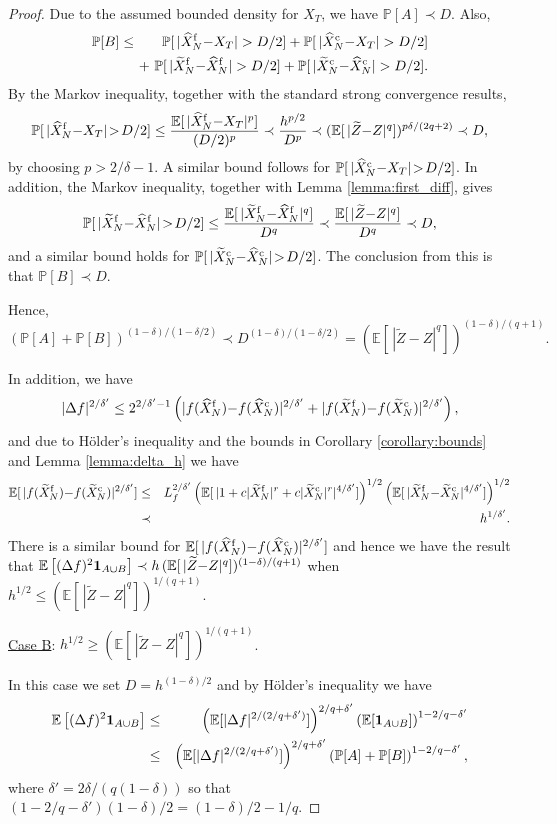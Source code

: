 \documentclass[11pt]{article}
\def \EE {{\mathbb{E}}}
\def \PP {{\mathbb{P}}}
\def \one {{\bf 1}}
\def \tZ {{\widetilde{Z}}}
\def \tXf  {{\widetilde{X}^{\rm f}}}
\def \tXc  {{\widetilde{X}^{\rm c}}}
\def \hXf {{\widehat{X}^{\rm f}}}
\def \hXc {{\widehat{X}^{\rm c}}}
\begin{document}
\begin{proof}
Due to the assumed bounded density for $X_T$, we have
$\PP[A] \prec D$.  Also, 
\begin{eqnarray*}
\PP[B] &\leq&  ~
\PP[\, |\hXf_N {-} X_T| > D/2] +
\PP[\, |\hXc_N {-} X_T| > D/2]
\\ & & \!\!\!\! +\
\PP[\, |\tXf_N {-} \hXf_N| > D/2] +
\PP[\, |\tXc_N {-} \hXc_N| > D/2].
\end{eqnarray*}
By the Markov inequality, together with the standard strong convergence
results,
\[
\PP[\, |\hXf_N {-} X_T| \!>\! D/2] 
\leq \frac{\EE[\, |\hXf_N {-} X_T|^p]}{(D/2)^p}
\prec \frac{h^{p/2}}{D^p}
\prec (\EE[\, |\tZ{-}Z|^q])^{p\delta/(2q+2)}
\prec D,
\]
by choosing $p>2/\delta - 1$.  A similar bound follows for
$\PP[\, |\hXc_N {-} X_T| \!>\! D/2]$.
In addition, the Markov inequality, together with Lemma \ref{lemma:first_diff}, gives
\[
\PP[\, |\tXf_N {-} \hXf_N| \!>\! D/2] 
\leq \frac{\EE[\, |\tXf_N {-} \hXf_N|^q]}{D^q}
\prec \frac{\EE[\, |\tZ{-}Z|^q]}{D^q} 
\prec D,
\]
and a similar bound holds for $\PP[\, |\tXc_N {-} \hXc_N| \!>\! D/2]$.
The conclusion from this is that $\PP[B]\prec D$.

Hence,
\[
\left( \PP[A] + \PP[B] \right)^{(1-\delta)/(1-\delta/2)} \prec D^{(1-\delta)/(1-\delta/2)}
 =  (\EE[\, |\tZ{-}Z|^q])^{(1-\delta)/(q+1)}.
\]

In addition, we have
\[
|\Delta f|^{2/\delta'} \leq 2^{2/\delta'-1}\left(
  |f(\hXf_N) {-} f(\hXc_N)|^{2/\delta'} + |f(\tXf_N) {-} f(\tXc_N)|^{2/\delta'}
  \right),
\]
and due to H\"older's inequality and the bounds in Corollary \ref{corollary:bounds}
and Lemma \ref{lemma:delta_h} we have
\begin{eqnarray*}
\EE[\,|f(\tXf_N) {-} f(\tXc_N)|^{2/\delta'}]
&\leq& L_f^{2/\delta'} \left( \EE[\, |1 + c |\tXf_N|^r + c |\tXc_N|^r|^{4/\delta'}]\right)^{1/2}
       \left( \EE[\, |\tXf_N {-} \tXc_N|^{4/\delta'}]\right)^{1/2}
       \\ &\prec& h^{1/\delta'}.
\end{eqnarray*}
There is a similar bound for $\EE[\,|f(\hXf_N) {-} f(\hXc_N)|^{2/\delta'}]$
and hence we have the result that 
$\EE\left[ (\Delta f)^2 \one_{A\cup B} \right]
\prec h \, (\EE[\, |\tZ{-}Z|^q])^{(1-\delta)/(q+1)}$
when $h^{1/2}\leq  (\EE[\, |\tZ{-}Z|^q])^{1/(q+1)}$.


\vspace{0.2in}

\underline{Case B}: $h^{1/2} \geq (\EE[\, |\tZ{-}Z|^q])^{1/(q+1)}$.

In this case we set $D\!=\!h^{(1-\delta)/2}$ and by H\"older's
inequality we have
\begin{eqnarray*}
\EE\left[ (\Delta f)^2 \one_{A\cup B} \right]
&\leq& \left( \EE[ |\Delta f|^{2/(2/q+\delta')}] \right)^{2/q +\delta'}
       \left( \EE[\one_{A\cup B}] \right)^{1-2/q-\delta'}
\\ &\leq& \left( \EE[ |\Delta f|^{2/(2/q+\delta')}] \right)^{2/q+\delta'}
          \left( \PP[A] + \PP[B] \right)^{1-2/q-\delta'},
\end{eqnarray*}
where $\delta'= 2\delta/(q(1{-}\delta))$ so that 
$(1{-}2/q{-}\delta')(1{-}\delta)/2 = (1{-}\delta)/2 - 1/q$.


\end{proof}
\end{document}
